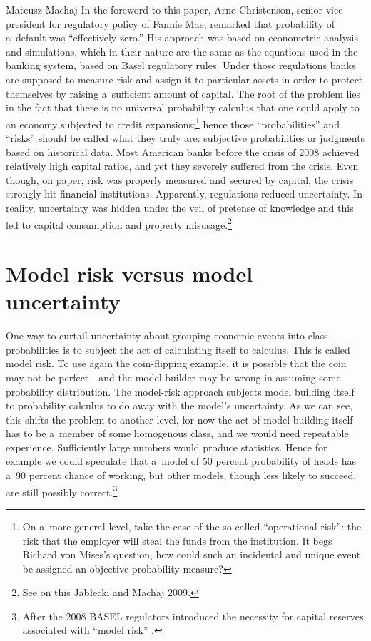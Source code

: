 \begin{artengenv}{Mateusz Machaj}
In the foreword to this paper, Arne Christenson, senior vice president for regulatory policy of Fannie Mae, remarked that probability of a~default was ``effectively zero.'' His approach was based on econometric analysis and simulations, which in their nature are the same as the equations used in the banking system, based on Basel regulatory rules. Under those regulations banks are supposed to measure risk and assign it to particular assets in order to protect themselves by raising a~sufficient amount of capital. The root of the problem lies in the fact that there is no universal probability calculus that one could apply to an economy subjected to credit expansions;\footnote{On a~more general level, take the case of the so called ``operational risk'': the risk that the employer will steal the funds from the institution. It begs Richard von Mises's question, how could such an incidental and unique event be assigned an objective probability measure?} hence those ``probabilities'' and ``risks'' should be called what they truly are: subjective probabilities or judgments based on historical data. Most American banks before the crisis of 2008 achieved relatively high capital ratios, and yet they severely suffered from the crisis. Even though, on paper, risk was properly measured and secured by capital, the crisis strongly hit financial institutions. Apparently, regulations reduced uncertainty. In reality, uncertainty was hidden under the veil of pretense of knowledge and this led to capital consumption and property misusage.\footnote{See on this Jabłecki and Machaj 2009.}



\section{Model risk versus model uncertainty}

One way to curtail uncertainty about grouping economic events into class probabilities is to subject the act of calculating itself to calculus. This is called model risk. To use again the coin-flipping example, it is possible that the coin may not be perfect---and the model builder may be wrong in assuming some probability distribution. The model-risk approach subjects model building itself to probability calculus to do away with the model's uncertainty. As we can see, this shifts the problem to another level, for now the act of model building itself has to be a~member of some homogenous class, and we would need repeatable experience. Sufficiently large numbers would produce statistics. Hence for example we could speculate that a~model of 50 percent probability of heads has a~90 percent chance of working, but other models, though less likely to succeed, are still possibly correct.\footnote{After the 2008 BASEL regulators introduced the necessity for capital reserves associated with ``model risk'' 
\parencite[][p.1295]{alexander_quantile_2012}.%
}




\end{artengenv}
